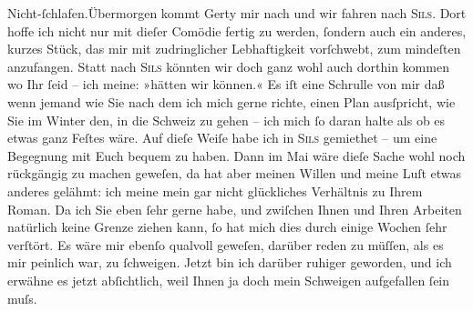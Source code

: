 \begin{ledgroupsized}[t]{13cm}
                  Nicht-ſchlafen.\hspace*{1.5em}Übermorgen kommt Gerty mir nach und {\pb}wir fahren nach \textsc{Sils}. Dort hoffe ich nicht nur mit dieſer Comödie fertig zu werden, ſondern auch ein anderes, kurzes Stück, das mir mit
               zudringlicher Lebhaftigkeit vorſchwebt, zum mindeſten anzufangen. \hspace*{1.5em}Statt nach \textsc{Sils} könnten wir doch ganz wohl auch dorthin kommen wo {\pb}Ihr ſeid – ich meine: »hätten wir
               können.« Es iſt eine Schrulle von mir daß wenn jemand wie Sie nach dem ich mich gerne
               richte, einen Plan ausſpricht, wie Sie im Winter den, in die Schweiz zu gehen – ich mich ſo daran halte als ob es etwas ganz
               Feſtes wäre. Auf dieſe Weiſe habe ich in \textsc{Sils} gemiethet – um eine Begegnung mit Euch {\pb}bequem zu haben. Dann im
                  Mai wäre dieſe Sache wohl noch rückgängig zu machen geweſen, da hat
               aber meinen Willen und meine Luſt etwas anderes gelähmt: ich meine mein gar nicht
               glückliches Verhältnis zu Ihrem Roman. Da ich Sie eben ſehr gerne habe, und zwiſchen Ihnen und Ihren
               Arbeiten natürlich keine Grenze ziehen kann, ſo hat mich dies {\pb}durch einige Wochen ſehr verſtört.
               Es wäre mir ebenſo qualvoll geweſen, darüber reden zu müſſen, als es mir peinlich
               war,  zu ſchweigen.\pend
           \pstart
           Jetzt bin ich darüber ruhiger geworden, und ich erwähne es jetzt abſichtlich, weil
               Ihnen ja doch mein Schweigen aufgefallen ſein muſs.\pend

\end{ledgroupsized}
